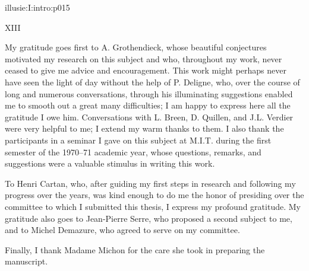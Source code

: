 \IllusieSetPhysicalPageSize{450.6bp}{704bp}
\begin{illusiefrontpage}{illusie:I:intro:p015}{}
\begin{center}\fontsize{10}{12}\selectfont XIII\end{center}
\vspace{12bp}
\hypertarget{illusie:I:intro:p015:p1}{}%
\hspace*{22bp}My gratitude goes first to A. Grothendieck, whose beautiful conjectures
motivated my research on this subject and who, throughout my work, never ceased
to give me advice and encouragement. This work might perhaps never have seen the
light of day without the help of P. Deligne, who, over the course of long and
numerous conversations, through his illuminating suggestions enabled me to
smooth out a great many difficulties; I am happy to express here all the
gratitude I owe him. Conversations with L. Breen, D. Quillen, and J.L. Verdier
were very helpful to me; I extend my warm thanks to them. I also thank the
participants in a seminar I gave on this subject at M.I.T. during the first
semester of the 1970--71 academic year, whose questions, remarks, and suggestions
were a valuable stimulus in writing this work.

\vspace{8bp}
\hypertarget{illusie:I:intro:p015:p2}{}%
\hspace*{22bp}To Henri Cartan, who, after guiding my first steps in research and
following my progress over the years, was kind enough to do me the honor of
presiding over the committee to which I submitted this thesis, I express my
profound gratitude. My gratitude also goes to Jean-Pierre Serre, who proposed a
second subject to me, and to Michel Demazure, who agreed to serve on my committee.

\vspace{8bp}
\hypertarget{illusie:I:intro:p015:p3}{}%
\hspace*{22bp}Finally, I thank Madame Michon for the care she took in preparing the
manuscript.
\end{illusiefrontpage}
